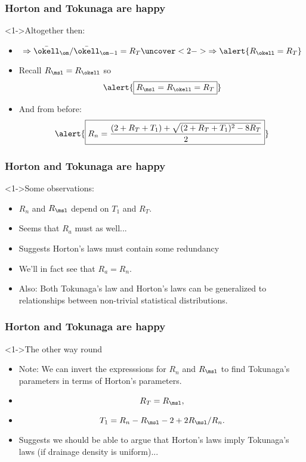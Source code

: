 \begin{frame}[label=]
  \frametitle{Horton and Tokunaga are happy}

  \begin{block}<1->{Altogether then:}
  \begin{itemize}
  \item<1-> 
      $$ \Rightarrow \bar{\okell}_\om/\bar{\okell}_{\om-1} = R_T
      \uncover<2->{
        \Rightarrow \alert{R_\okell = R_T} 
      }
      $$
    \item<3->
      Recall $R_\msl = R_\okell$ so 
      $$ 
      \alert{\boxed{R_\msl = R_\okell =  R_T}}
      $$
    \item<4->
      And from before:
      $$
      \alert{\boxed{
      R_n
      =
      \frac{
      (2+R_T+T_1)
      +
      \sqrt{
        (2+R_T+T_1)^2-8R_T
        }
      }
      {2}
    }}
      $$
  \end{itemize}
  \end{block}

\end{frame}


\begin{frame}[label=]
  \frametitle{Horton and Tokunaga are happy}

  \begin{block}<1->{Some observations:}
    \begin{itemize}
    \item<1->
      $R_n$ and $R_\msl$ depend on $T_1$ and $R_T$.
    \item<2->
      Seems that $R_a$ must as well...
    \item<3-> Suggests Horton's laws must contain some redundancy
    \item<4-> We'll in fact see that $R_a = R_n$.
    \item<5-> Also: Both Tokunaga's law and Horton's laws
      can be generalized to relationships between
      non-trivial statistical distributions.\cite{dodds2001b,dodds2001c}
    \end{itemize}
  \end{block}

\end{frame}

\begin{frame}[label=]
  \frametitle{Horton and Tokunaga are happy}
  
  \begin{block}<1->{The other way round}
    \begin{itemize}
    \item<1-> Note: We can invert the expresssions
      for $R_n$ and $R_\msl$ to find Tokunaga's
      parameters in terms of Horton's parameters.
    \item<2-> 
      $$
      R_T = R_\msl,
      $$
    \item<2->
      $$
      T_1  =  R_n - R_\msl - 2 + 2R_\msl/R_n.
      $$
    \item<3-> 
      Suggests we should be able to argue that Horton's laws
      imply Tokunaga's laws (if drainage density is uniform)...
    \end{itemize}
  \end{block}

\end{frame}

